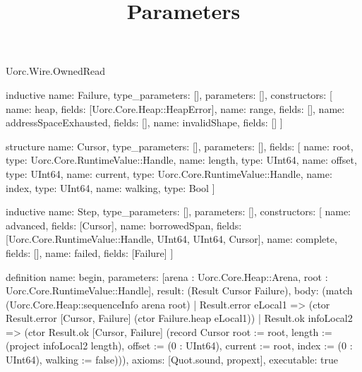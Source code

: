 \begin{lexlean}{Uorc.Wire.OwnedRead}
\title{Parameters}
\begin{semanticmodule}
inductive{
  name: Failure,
  type_parameters: [],
  parameters: [],
  constructors: [
    {name: heap, fields: [Uorc.Core.Heap::HeapError]},
    {name: range, fields: []},
    {name: addressSpaceExhausted, fields: []},
    {name: invalidShape, fields: []}
  ]
}

structure{
  name: Cursor,
  type_parameters: [],
  parameters: [],
  fields: [
    {name: root, type: Uorc.Core.RuntimeValue::Handle},
    {name: length, type: UInt64},
    {name: offset, type: UInt64},
    {name: current, type: Uorc.Core.RuntimeValue::Handle},
    {name: index, type: UInt64},
    {name: walking, type: Bool}
  ]
}

inductive{
  name: Step,
  type_parameters: [],
  parameters: [],
  constructors: [
    {name: advanced, fields: [Cursor]},
    {name: borrowedSpan, fields: [Uorc.Core.RuntimeValue::Handle, UInt64, UInt64, Cursor]},
    {name: complete, fields: []},
    {name: failed, fields: [Failure]}
  ]
}

definition{
  name: begin,
  parameters: [arena : Uorc.Core.Heap::Arena, root : Uorc.Core.RuntimeValue::Handle],
  result: (Result Cursor Failure),
  body: (match (Uorc.Core.Heap::sequenceInfo arena root)
    | Result.error eLocal1 => (ctor Result.error [Cursor, Failure] (ctor Failure.heap eLocal1))
    | Result.ok infoLocal2 => (ctor Result.ok [Cursor, Failure] (record Cursor {root := root, length := (project infoLocal2 length), offset := (0 : UInt64), current := root, index := (0 : UInt64), walking := false}))),
  axioms: [Quot.sound, propext],
  executable: true
}


\end{semanticmodule}
\end{lexlean}
